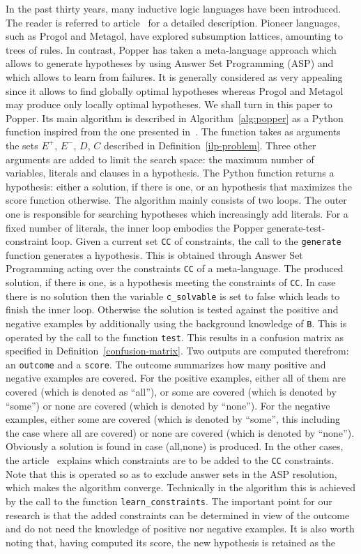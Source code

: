 In the past thirty years, many inductive logic languages have been introduced. The reader is referred to article~\cite{Cropper-30} for a detailed description. Pioneer languages, such as Progol and Metagol, have explored subsumption lattices, amounting to trees of rules. In contrast, Popper has taken a meta-language approach which allows to generate hypotheses by using Answer Set Programming (ASP) and which allows to learn from failures. It is generally considered as very appealing since it allows to find globally optimal hypotheses whereas Progol and Metagol may produce only locally optimal hypotheses. We shall turn in this paper to Popper. Its main algorithm is described in Algorithm~\ref{alg:popper} as a Python function inspired from the one presented in~\cite{cropper2021learning}. The function takes as arguments the sets $E^+$, $E^-$, $D$, $C$ described in Definition~\ref{ilp-problem}. Three other arguments are added to limit the search space: the maximum number of variables, literals and clauses in a hypothesis. The Python function returns a hypothesis: either a solution, if there is one, or an hypothesis that maximizes the score function otherwise. The algorithm mainly consists of two loops. The outer one is responsible for searching hypotheses which increasingly add literals. For a fixed number of literals, the inner loop embodies the Popper generate-test-constraint loop. Given a current set \texttt{CC} of constraints, the call to the \texttt{generate} function generates a hypothesis. This is obtained through Answer Set Programming acting over the constraints \texttt{CC} of a meta-language. The produced solution, if there is one, is a hypothesis meeting the constraints of \texttt{CC}. In case there is no solution then the variable \texttt{c\_solvable} is set to false which leads to finish the inner loop. Otherwise the solution is tested against the positive and negative examples by additionally using the background knowledge of \texttt{B}. This is operated by the call to the function \texttt{test}. This results in a confusion matrix as specified in Definition~\ref{confusion-matrix}. Two outputs are computed therefrom: an \texttt{outcome} and a \texttt{score}. The outcome summarizes how many positive and negative examples are covered. For the positive examples, either all of them are covered (which is denoted as ``all''), or  some are covered (which is denoted by ``some'') or none are covered (which is denoted by ``none''). For the negative examples, either some are covered (which is denoted by ``some'', this including the case where all are covered) or none are covered (which is denoted by ``none''). Obviously a solution is found in case (all,none) is produced. In the other cases, the article~\cite{cropper2021learning} explains which constraints are to be added to the \texttt{CC} constraints. Note that this is operated so as to exclude answer sets in the ASP resolution, which makes the algorithm converge. Technically in the algorithm this is achieved by the call to the function \texttt{learn\_constraints}. The important point for our research is that the added constraints can be determined in view of the outcome and do not need the knowledge of positive nor negative examples. It is also worth noting that, having computed its score, the new hypothesis is retained as the 